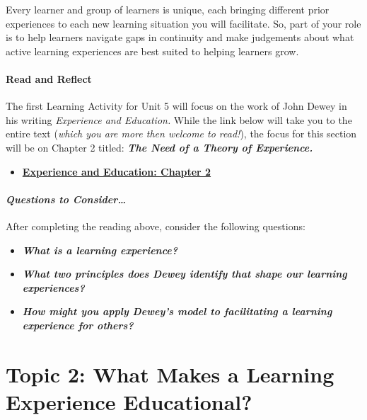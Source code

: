 \documentclass[
]{book}
\providecommand{\tightlist}{%
  \setlength{\itemsep}{0pt}\setlength{\parskip}{0pt}}
\begin{document}
Every learner and group of learners is unique, each bringing different prior experiences to each new learning situation you will facilitate. So, part of your role is to help learners navigate gaps in continuity and make judgements about what active learning experiences are best suited to helping learners grow.

\begin{reflect}
\hypertarget{read-and-reflect}{%
\paragraph{Read and Reflect}\label{read-and-reflect}}

The first Learning Activity for Unit 5 will focus on the work of John
Dewey in his writing \emph{Experience and Education.} While the link
below will take you to the entire text (\emph{which you are more then
welcome to read!}), the focus for this section will be on Chapter 2
titled: \textbf{\emph{The Need of a Theory of Experience.}}

\begin{itemize}
\tightlist
\item
  \href{http://ruby.fgcu.edu/courses/ndemers/colloquium/experienceducationdewey.pdf}{\textbf{Experience
  and Education: Chapter 2}}
\end{itemize}

\hypertarget{questions-to-consider}{%
\paragraph{\texorpdfstring{\textbf{\emph{Questions to
Consider\ldots{}}}}{Questions to Consider\ldots{}}}\label{questions-to-consider}}

After completing the reading above, consider the following questions:

\begin{itemize}
\tightlist
\item
  \textbf{\emph{What is a learning experience?}}\\
\item
  \textbf{\emph{What two principles does Dewey identify that shape our
  learning experiences?}}\\
\item
  \textbf{\emph{How might you apply Dewey's model to facilitating a
  learning experience for others?}}
\end{itemize}
\end{reflect}

\hypertarget{topic-2-what-makes-a-learning-experience-educational}{%
\section*{Topic 2: What Makes a Learning Experience Educational?}\label{topic-2-what-makes-a-learning-experience-educational}}
\end{document}
